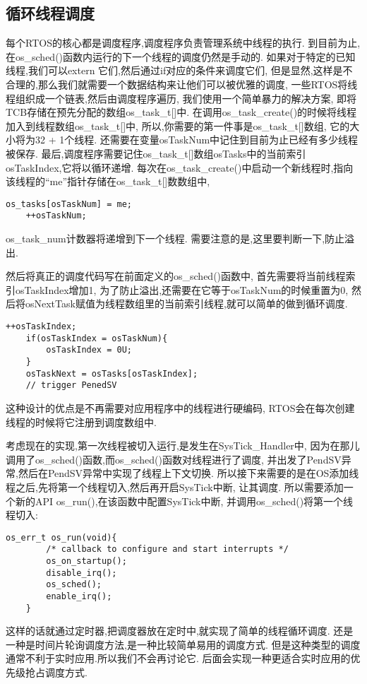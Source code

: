 \subsection{循环线程调度}
每个RTOS的核心都是调度程序,调度程序负责管理系统中线程的执行.
到目前为止,在os\_sched()函数内运行的下一个线程的调度仍然是手动的.
如果对于特定的已知线程,我们可以extern 它们,然后通过if对应的条件来调度它们,
但是显然,这样是不合理的,那么我们就需要一个数据结构来让他们可以被优雅的调度,
一些RTOS将线程组织成一个链表,然后由调度程序遍历,
我们使用一个简单暴力的解决方案,
即将TCB存储在预先分配的数组os\_task\_t[]中.
在调用os\_task\_create()的时候将线程加入到线程数组os\_task\_t[]中,
所以,你需要的第一件事是os\_task\_t[]数组,
它的大小将为32 + 1个线程.
还需要在变量osTaskNum中记住到目前为止已经有多少线程被保存.
最后,调度程序需要记住os\_task\_t[]数组osTasks中的当前索引osTaskIndex,它将以循环递增.
每次在os\_task\_create()中启动一个新线程时,指向该线程的“me”指针存储在os\_task\_t[]数数组中,
\begin{lstlisting}[language={[ANSI]C},keywordstyle=\color{blue!70},commentstyle=\color{red!50!green!50!blue!50},frame=shadowbox, rulesepcolor=\color{red!20!green!20!blue!20}]  
    os_tasks[osTaskNum] = me;
    ++osTaskNum;
\end{lstlisting}
os\_task\_num计数器将递增到下一个线程.
需要注意的是,这里要判断一下,防止溢出.

然后将真正的调度代码写在前面定义的os\_sched()函数中,
首先需要将当前线程索引osTaskIndex增加1,
为了防止溢出,还需要在它等于osTaskNum的时候重置为0,
然后将osNextTask赋值为线程数组里的当前索引线程,就可以简单的做到循环调度.
\begin{lstlisting}[language={[ANSI]C},keywordstyle=\color{blue!70},commentstyle=\color{red!50!green!50!blue!50},frame=shadowbox, rulesepcolor=\color{red!20!green!20!blue!20}]  
    ++osTaskIndex;
    if(osTaskIndex = osTaskNum){
        osTaskIndex = 0U;
    }
    osTaskNext = osTasks[osTaskIndex];
    // trigger PenedSV
\end{lstlisting}
这种设计的优点是不再需要对应用程序中的线程进行硬编码,
RTOS会在每次创建线程的时候将它注册到调度数组中.

考虑现在的实现,第一次线程被切入运行,是发生在SysTick\_Handler中,
因为在那儿调用了os\_sched()函数,而os\_sched()函数对线程进行了调度,
并出发了PendSV异常,然后在PendSV异常中实现了线程上下文切换.
所以接下来需要的是在OS添加线程之后,先将第一个线程切入,然后再开启SysTick中断,
让其调度.
所以需要添加一个新的API os\_run(),在该函数中配置SysTick中断,
并调用os\_sched()将第一个线程切入:
\begin{lstlisting}[language={[ANSI]C},keywordstyle=\color{blue!70},commentstyle=\color{red!50!green!50!blue!50},frame=shadowbox, rulesepcolor=\color{red!20!green!20!blue!20}]  
    os_err_t os_run(void){
        /* callback to configure and start interrupts */
        os_on_startup();
        disable_irq();
        os_sched();
        enable_irq();
    }
\end{lstlisting}
这样的话就通过定时器,把调度器放在定时中,就实现了简单的线程循环调度.
还是一种是时间片轮询调度方法,是一种比较简单易用的调度方式.
但是这种类型的调度通常不利于实时应用.所以我们不会再讨论它.
后面会实现一种更适合实时应用的优先级抢占调度方式.

